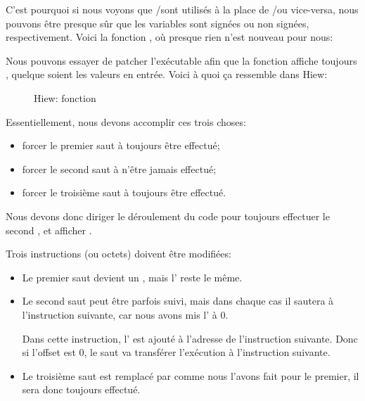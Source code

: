 C'est pourquoi si nous voyons que \JG/\JL sont utilisés à la place de /\JB ou
vice-versa, nous pouvons être presque sûr que les variables sont signées ou non
signées, respectivement.
Voici la fonction \main, où presque rien n'est nouveau pour nous:





\clearpage
{}

Nous pouvons essayer de patcher l'exécutable afin que la fonction 
affiche toujours , quelque soient les valeurs en entrée.
Voici à quoi ça ressemble dans Hiew:

\begin{figure}[H]
\centering
{}
\caption{Hiew: fonction }
\label{fig:jcc_hiew_1}
\end{figure}

Essentiellement, nous devons accomplir ces trois choses:
\begin{itemize}
\item forcer le premier saut à toujours être effectué;
\item forcer le second saut à n'être jamais effectué;
\item forcer le troisième saut à toujours être effectué.
\end{itemize}

Nous devons donc diriger le déroulement du code pour toujours effectuer le second \printf,
et afficher .

Trois instructions (ou octets) doivent être modifiées:

\begin{itemize}
\item Le premier saut devient un \JMP, mais l' reste
le même.

\item
Le second saut peut être parfois suivi, mais dans chaque cas il sautera à l'instruction
suivante, car nous avons mis l' à 0.

Dans cette instruction, l' est ajouté à l'adresse
de l'instruction suivante. Donc si l'offset est 0, le saut va transférer l'exécution
à l'instruction suivante.

\item
Le troisième saut est remplacé par \JMP comme nous l'avons fait pour le premier,
il sera donc toujours effectué.

\end{itemize}

